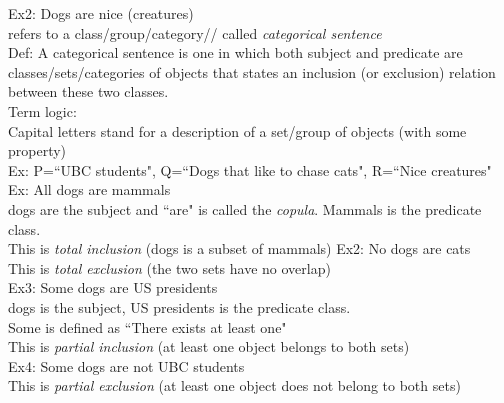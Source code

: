 \documentclass[11pt, fleqn]{article}
\begin{document}
Ex2: Dogs are nice (creatures)\\
refers to a class/group/category//
called \textit{categorical sentence}\\
Def: A categorical sentence is one in which both subject and predicate are classes/sets/categories of objects that states an inclusion (or exclusion) relation between these two classes.\\

Term logic:\\
Capital letters stand for a description of a set/group of objects (with some property)\\
Ex: P=``UBC students", Q=``Dogs that like to chase cats", R=``Nice creatures"\\

Ex: All dogs are mammals\\
dogs are the subject and ``are" is called the \textit{copula}. Mammals is the predicate class.\\
This is \textit{total inclusion} (dogs is a subset of mammals)
Ex2: No dogs are cats\\
This is \textit{total exclusion} (the two sets have no overlap)\\
Ex3: Some dogs are US presidents\\
dogs is the subject, US presidents is the predicate class.\\
Some is defined as ``There exists at least one"\\
This is \textit{partial inclusion} (at least one object belongs to both sets)\\
Ex4: Some dogs are not UBC students\\
This is \textit{partial exclusion} (at least one object does not belong to both sets)\\
\end{document}
